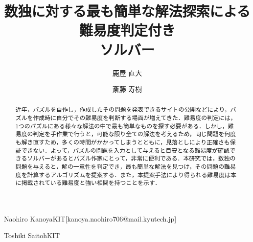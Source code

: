 \documentclass[submit,techrep,noauthor]{ipsj}
\begin{document}
\title{数独に対する最も簡単な解法探索による難易度判定付き\\ソルバー}




\author{鹿屋 直大}{Naohiro Kanoya}{KIT}[kanoya.naohiro706@mail.kyutech.jp]
\author{斎藤 寿樹}{Toshiki Saitoh}{KIT}

\begin{abstract}
近年，パズルを自作し，作成したその問題を発表できるサイトの公開などにより，パズルを作成時に自分でその難易度を判断する場面が増えてきた．難易度の判定には，1つのパズルにある様々な解法の中で最も簡単なものを探す必要がある．しかし，難易度の判定を手作業で行うと，可能な限り全ての解法を考えるため，同じ問題を何度も解き直すため，多くの時間がかかってしまうとともに，見落としにより正確さも保証できない．よって，パズルの問題を入力として与えると目安となる難易度が確認できるソルバーがあるとパズル作家にとって，非常に便利である．本研究では，数独の問題を与えると，解の一意性を判定でき，最も簡単な解法を見つけ，その問題の難易度を計算するアルゴリズムを提案する．また，本提案手法により得られる難易度は本に掲載されている難易度と強い相関を持つことを示す．
\end{abstract}


%
%
%


\maketitle
\end{document}
